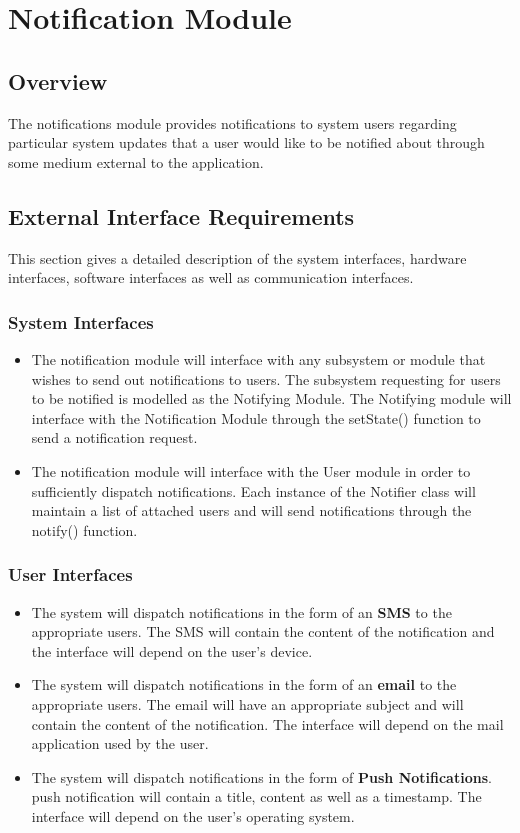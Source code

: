 \section{Notification Module}
\subsection{Overview}
The notifications module provides notifications to system users regarding particular system updates that a user would like to be notified about through some medium external to the application. 
\subsection{External Interface Requirements}
This section gives a detailed description of the system interfaces, hardware interfaces, software interfaces as well as communication interfaces.
\subsubsection{System Interfaces}
\begin{itemize}
	\item The notification module will interface with any subsystem or module that wishes to send out notifications to users. The subsystem requesting for users to be notified is modelled as the Notifying Module. The Notifying module will interface with the Notification Module through the setState() function to send a notification request. 
	
	\item The notification module will interface with the User module in order to sufficiently dispatch notifications. Each instance of the Notifier class will maintain a list of attached users and will send notifications through the notify() function.
\end{itemize}

\subsubsection{User Interfaces}
\begin{itemize}
	\item The system will dispatch notifications in the form of an \textbf{SMS} to the appropriate users. The SMS will contain the content of the notification and the interface will depend on the user's device.
	
	\item The system will dispatch notifications in the form of an \textbf{email} to the appropriate users. The email will have an appropriate subject and will contain the content of the notification. The interface will depend on the mail application used by the user.
	
	\item The system will dispatch notifications in the form of \textbf{Push Notifications}.  push notification will contain a title, content as well as a timestamp. The interface will depend on the user's operating system. 
\end{itemize}


